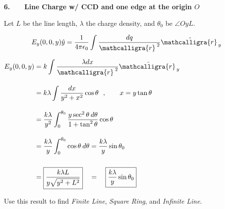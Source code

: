 \documentclass[12pt]{article}
\newcommand{\scripty}[1]{\ensuremath{\mathcalligra{#1}}}
\newcommand{\cursr}{\scripty{r}}		%
\newcommand{\cursrr}{\scripty{r}\ }
\newcommand{\hs}{\hspace{1pt}} %
\newcommand{\nhs}{\hspace{-1pt}} %
\begin{document}
%
%
%
\newpage

\noindent
\begin{minipage}[t]{.48\textwidth}
	\textbf{6. \ \ \ Line Charge w/ CCD and one edge at the origin \(O\)}
	
	\vspace{10pt}	
	Let \(L\) be the line length, \(\lambda\) the charge density,
	and \(\theta_0\) be \(\angle OyL\).

	\vspace{5pt}
	\[ \displaystyle E_y(0,0,y) \hat{y} = \frac{1}{4 \pi \epsilon_0} \int \frac{dq}{\cursr^{\hs\hs 2}} \hat{\cursrr}_{\nhs\nhs y}\]

	\vspace{10pt}
	\(\begin{aligned}
		E_y(0,0,y) &= k \int \frac{\lambda dx}{\cursr^{\hs\hs 2}} \hat{\cursrr}_{\nhs\nhs y}\\[10pt]
		&= k \lambda \int \frac{ dx}{y^2 + x^2} \cos{\theta}
			\ \ , \hspace{20pt} x = y \tan{\theta}\\[10pt]
		&= \frac{k \lambda}{y^2} \int_0^{\theta_0} \frac{y \sec^2{\theta} \hs\hs d\theta}{1 + \tan^2{\theta}} \cos{\theta}\\[10pt]
		&= \frac{k \lambda}{y} \int_0^{\theta_0} \cos{\theta} \hs\hs d\theta = \frac{k \lambda}{y} \sin{\theta_0} \\[15pt]
		&= \boxed{ \frac{k \lambda L}{y \sqrt{y^2+L^2}} } \quad = \quad \boxed{ \frac{k \lambda}{y} \sin{\theta_0}}
	\end{aligned}\)

	\vspace{30pt}
	Use this result to find \textit{Finite Line}, \textit{Square Ring}, and \textit{Infinite Line}.
\end{minipage}
\hfill\vline\hfill
\end{document}
